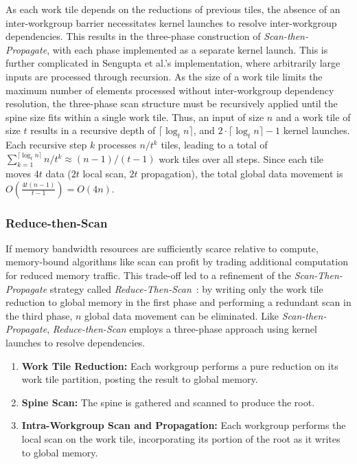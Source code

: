 \documentclass[sigconf]{acmart}
\begin{document}
As each work tile depends on the reductions of previous tiles, the absence of an inter-workgroup barrier necessitates kernel launches to resolve inter-workgroup dependencies. This results in the three-phase construction of \emph{Scan-then-Propagate}, with each phase implemented as a separate kernel launch. This is further complicated in Sengupta et al.'s implementation, where arbitrarily large inputs are processed through recursion. As the size of a work tile limits the maximum number of elements processed without inter-workgroup dependency resolution, the three-phase scan structure must be recursively applied until the spine size fits within a single work tile. Thus, an input of size $n$ and a work tile of size $t$ results in a recursive depth of $\lceil \log_t n \rceil$, and $2\cdot\lceil \log_t n \rceil - 1$ kernel launches. Each recursive step $k$ processes $n/t^k$ tiles, leading to a total of $\sum_{k=1}^{\lceil \log_t n \rceil} n/t^k \approx (n - 1)/(t - 1)$ work tiles over all steps. Since each tile moves $4t$ data ($2t$ local scan, $2t$ propagation), the total global data movement is $O\left(\frac{4t(n - 1)}{t - 1}\right) = O(4n)$.

\subsubsection{Reduce-then-Scan}
If memory bandwidth resources are sufficiently scarce relative to compute, memory-bound algorithms like scan can profit by trading additional computation for reduced memory traffic. This trade-off led to a refinement of the \emph{Scan-Then-Propagate} strategy called \emph{Reduce-Then-Scan}~\cite{Merrill-Grimshaw, Ha-and-Han, Dotsenko, Breitbart}: by writing only the work tile reduction to global memory in the first phase and performing a redundant scan in the third phase, $n$ global data movement can be eliminated. Like \emph{Scan-then-Propagate}, \emph{Reduce-then-Scan} employs a three-phase approach using kernel launches to resolve dependencies.
\begin{enumerate}
  \item \textbf{Work Tile Reduction:} Each workgroup performs a pure reduction on its work tile partition, posting the result to global memory.
  \item \textbf{Spine Scan:} The spine is gathered and scanned to produce the root.
  \item \textbf{Intra-Workgroup Scan and Propagation:} Each workgroup performs the local scan on the work tile, incorporating its portion of the root as it writes to global memory.
\end{enumerate}
\end{document}
